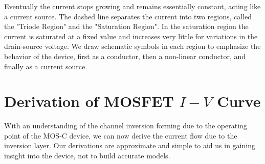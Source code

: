 Eventually the current stops growing and remains essentially constant, acting like a current source.  The dashed line separates the current into two regions, called the "Triode Region" and the "Saturation Region".  In the saturation region the current is saturated at a fixed value and increases very little for variations in the drain-source voltage.  We draw schematic symbols in each region to emphasize the behavior of the device, first as a conductor, then a non-linear conductor, and finally as a current source.
\section{Derivation of MOSFET \texorpdfstring{$I-V$}{I-V} Curve}
With an understanding of the channel inversion forming due to the operating point of the MOS-C device, we can now derive the current flow due to the inversion layer.  Our derivations are approximate and simple to aid us in gaining insight into the device, not to build accurate models.
